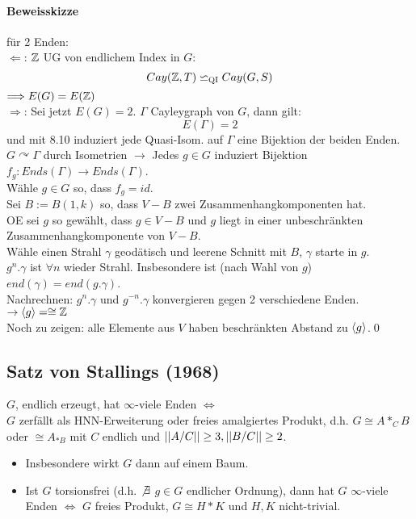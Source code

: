 \documentclass{article}
\newcommand{\qi}{\backsimeq_{\textsc{QI}}}
\begin{document}
\paragraph{Beweisskizze} für 2 Enden:\\
$\Longleftarrow$: $\mathbb{Z}$ UG von endlichem Index in $G$:
\[Cay(\Z, T)  \qi Cay(G,S) \]
$\Longrightarrow E(G) = E(\mathbb{Z})$\\

$\Longrightarrow$: 
Sei jetzt $E(G) = 2$. $\Gamma$ Cayleygraph von $G$, dann gilt:
\[E(\Gamma) = 2\]
und mit 8.10 induziert jede Quasi-Isom. auf $\Gamma$ eine Bijektion der beiden Enden.\\
$G \curvearrowright \Gamma$ durch Isometrien $\rightarrow$ Jedes $g \in G$ induziert Bijektion $f_g : Ends(\Gamma) \rightarrow Ends(\Gamma)$.\\
Wähle $g \in G$ so, dass $f_g = id$.\\
Sei $B:=B(1,k)$ so, dass $V-B$ zwei Zusammenhangkomponenten hat.\\
OE sei $g$ so gewählt, dass $g\in V-B$ und $g$ liegt in einer unbeschränkten Zusammenhangkomponente von $V-B$. \\
Wähle einen Strahl $\gamma$ geodätisch und leerene Schnitt mit $B$, $\gamma$ starte in $g$.\\
$g^n.\gamma$ ist $\forall n$ wieder Strahl. Insbesondere ist (nach Wahl von $g$) $end(\gamma) = end(g.\gamma)$.\\
Nachrechnen: $g^n.\gamma$ und $g^{-n}.\gamma$ konvergieren gegen 2 verschiedene Enden. $\rightarrow \grp{g}{} = \cong \Z$\\
Noch zu zeigen: alle Elemente aus $V$ haben beschränkten Abstand zu $\grp{g}{}$.\qed

\subsection{Satz von Stallings (1968)}
$G$, endlich erzeugt, hat $\infty$-viele Enden $\Longleftrightarrow$\\
$G$ zerfällt als HNN-Erweiterung oder freies amalgiertes Produkt, d.h. $G \cong A *_C B$ oder $\cong A_{*B}$ mit $C$ endlich und $\left|\left|A/C\right|\right| \geq 3, \left|\left|B/C\right|\right| \geq 2$.
\begin{itemize}
	\item Insbesondere wirkt $G$ dann auf einem Baum.
	\item Ist $G$ torsionsfrei (d.h. $\not \exists$ $g\in G$ endlicher Ordnung), dann hat $G$ $\infty$-viele Enden $\Longleftrightarrow$ $G$ freies Produkt, $G \cong H * K$ und $H,K$ nicht-trivial.
\end{itemize}

\end{document}
